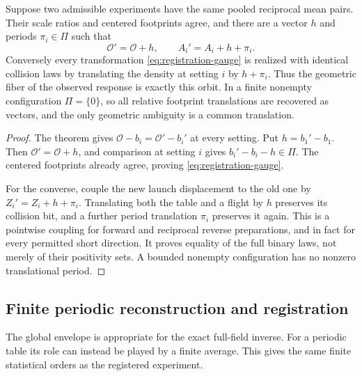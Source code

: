 \begin{corollary}
\label{cor:registration-fiber}
Suppose two admissible experiments have the same pooled reciprocal
mean pairs. Their scale ratios and centered footprints agree, and
there are a vector $h$ and periods $\pi_i\in\Pi$ such that
\begin{equation}\label{eq:registration-gauge}
            \mathcal O'=\mathcal O+h,
              \qquad A_i'=A_i+h+\pi_i.
\end{equation}
Conversely every transformation \eqref{eq:registration-gauge} is
realized with identical collision laws by translating the density at
setting $i$ by $h+\pi_i$. Thus the geometric fiber of the observed
response is exactly this orbit. In a finite nonempty configuration
$\Pi=\{0\}$, so all relative footprint translations are recovered
as vectors, and the only geometric ambiguity is a common translation.
\end{corollary}
\begin{proof}
The theorem gives $\mathcal O-b_i=\mathcal O'-b_i'$ at every setting.
Put $h=b_1'-b_1$. Then $\mathcal O'=\mathcal O+h$, and comparison
at setting $i$ gives $b_i'-b_i-h\in\Pi$. The centered footprints
already agree, proving \eqref{eq:registration-gauge}.

For the converse, couple the new launch displacement to the old one
by $Z_i'=Z_i+h+\pi_i$. Translating both the table and a flight by
$h$ preserves its collision bit, and a further period translation
$\pi_i$ preserves it again. This is a pointwise coupling for forward
and reciprocal reverse preparations, and in fact for every permitted
short direction. It proves equality of the full binary laws, not
merely of their positivity sets. A bounded nonempty configuration
has no nonzero translational period.
\end{proof}

\subsection{Finite periodic reconstruction and registration}
The global envelope is appropriate for the exact full-field inverse.
For a periodic table its role can instead be played by a finite
average. This gives the same finite statistical orders as the
registered experiment.

